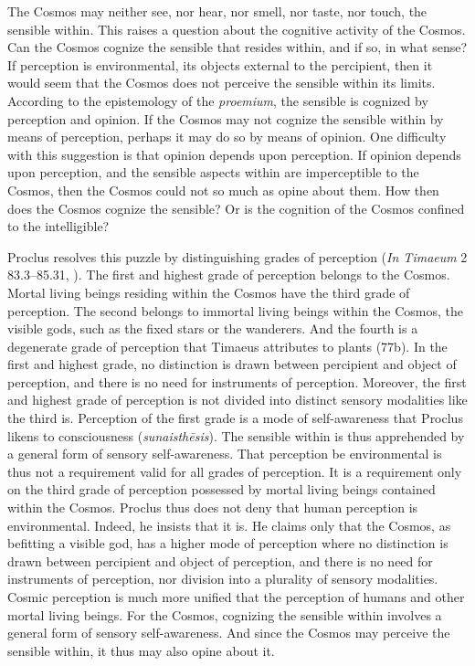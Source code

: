The Cosmos may neither see, nor hear, nor smell, nor taste, nor touch, the sensible within. This raises a question about the cognitive activity of the Cosmos. Can the Cosmos cognize the sensible that resides within, and if so, in what sense? If perception is environmental, its objects external to the percipient, then it would seem that the Cosmos does not perceive the sensible within its limits. According to the epistemology of the \emph{proemium}, the sensible is cognized by perception and opinion. If the Cosmos may not cognize the sensible within by means of perception, perhaps it may do so by means of opinion. One difficulty with this suggestion is that opinion depends upon perception. If opinion depends upon perception, and the sensible aspects within are imperceptible to the Cosmos, then the Cosmos could not so much as opine about them. How then does the Cosmos cognize the sensible? Or is the cognition of the Cosmos confined to the intelligible?

Proclus resolves this puzzle by distinguishing grades of perception (\emph{In Timaeum} 2 83.3--85.31, \citealt{Diehl:1903re}). The first and highest grade of perception belongs to the Cosmos. Mortal living beings residing within the Cosmos have the third grade of perception. The second belongs to immortal living beings within the Cosmos, the visible gods, such as the fixed stars or the wanderers. And the fourth is a degenerate grade of perception that Timaeus attributes to plants (77b). In the first and highest grade, no distinction is drawn between percipient and object of perception, and there is no need for instruments of perception. Moreover, the first and highest grade of perception is not divided into distinct sensory modalities like the third is. Perception of the first grade is a mode of self-awareness that Proclus likens to consciousness (\emph{sunaisthēsis}). The sensible within is thus apprehended by a general form of sensory self-awareness. That perception be environmental is thus not a requirement valid for all grades of perception. It is a requirement only on the third grade of perception possessed by mortal living beings contained within the Cosmos. Proclus thus does not deny that human perception is environmental. Indeed, he insists that it is. He claims only that the Cosmos, as befitting a visible god, has a higher mode of perception where no distinction is drawn between percipient and object of perception, and there is no need for instruments of perception, nor division into a plurality of sensory modalities. Cosmic perception is much more unified that the perception of humans and other mortal living beings. For the Cosmos, cognizing the sensible within involves a general form of sensory self-awareness. And since the Cosmos may perceive the sensible within, it thus may also opine about it. 

